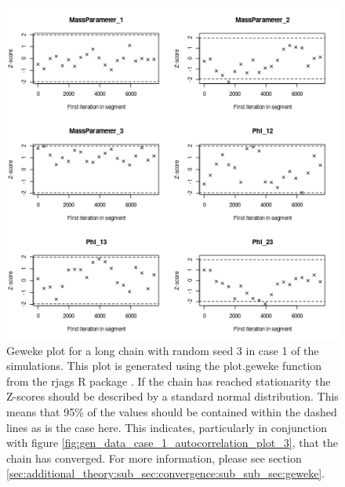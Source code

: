 \documentclass[12pt]{article} %
\begin{document}
	\begin{figure}[!htb]
		\centering
		\includegraphics[scale=0.65]{Images/Gen_data/Case_1/Geweke_plot_3.png}
		\caption{Geweke plot \citep{GewekeEvaluatingAccuracySamplingBased} for a long chain with random seed 3 in case 1 of the simulations. 	This plot is generated using the plot.geweke function from the rjags R package \citep{PlummerRjags2018}. If the chain has reached stationarity the Z-scores should be described by a standard normal distribution. This means that 95\% of the  values should be contained within the dashed lines as is the case here. This indicates, particularly in conjunction with figure \ref{fig:gen_data_case_1_autocorrelation_plot_3}, that the chain has converged. For more information, please see section \ref{sec:additional_theory:sub_sec:convergence:sub_sub_sec:geweke}.}
			
		\label{fig:gen_data_case_1_geweke_plot_3}
	\end{figure}
		
\end{document}
